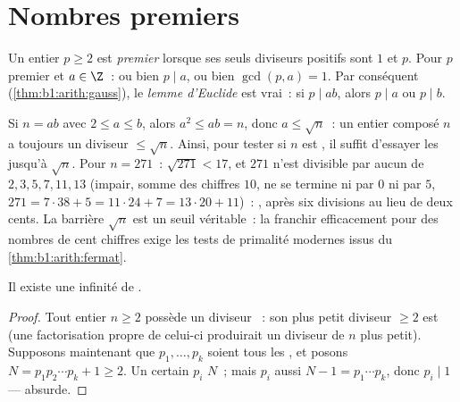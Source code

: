 \section{Nombres premiers}

\begin{definition}\label{def:b1:arith:prime}
Un entier $p \geq 2$ est \emph{premier} lorsque ses
seuls diviseurs positifs sont $1$ et $p$. Pour $p$ premier et $a \in \Z$~:
ou bien $p \mid a$, ou bien $\gcd(p, a) = 1$. Par conséquent
(\cref{thm:b1:arith:gauss}), le \emph{lemme d'Euclide} est vrai~: si $p \mid
ab$, alors $p \mid a$ ou $p \mid b$.
\end{definition}

\begin{remark}\label{rem:b1:arith:trialdivision}
Si $n = ab$ avec $2 \leq a \leq b$, alors $a^2 \leq ab = n$, donc $a
\leq \sqrt n$~: un entier composé $n$ a toujours un diviseur  $\leq
\sqrt n$. Ainsi, pour tester si $n$ est , il suffit d'essayer
les  jusqu'à $\sqrt n$. Pour $n = 271$~: $\sqrt{271} < 17$, et
$271$ n'est divisible par aucun de $2, 3, 5, 7, 11, 13$ (impair, somme
des chiffres $10$, ne se termine ni par $0$ ni par $5$, $271 = 7\cdot38 + 5 =
11\cdot24 + 7 = 13\cdot20 + 11$)~: , après six divisions
au lieu de deux cents. La barrière $\sqrt n$ est un seuil véritable~:
la franchir efficacement pour des nombres de cent chiffres exige les
tests de primalité modernes issus du
\cref{thm:b1:arith:fermat}.
\end{remark}

\begin{theorem}[Euclide]\label{thm:b1:arith:euclidprimes}
Il existe une infinité de .
\end{theorem}

\begin{proof}
Tout entier $n \geq 2$ possède un diviseur ~: son plus petit
diviseur $\geq 2$ est  (une factorisation propre de celui-ci
produirait un diviseur de $n$ plus petit). Supposons maintenant que $p_1, \dots, p_k$ soient tous les
, et posons $N = p_1 p_2 \cdots p_k + 1 \geq 2$. Un certain  $p_i$
 $N$~; mais $p_i$  aussi $N - 1 = p_1\cdots p_k$, donc $p_i
\mid 1$ --- absurde.
\end{proof}

